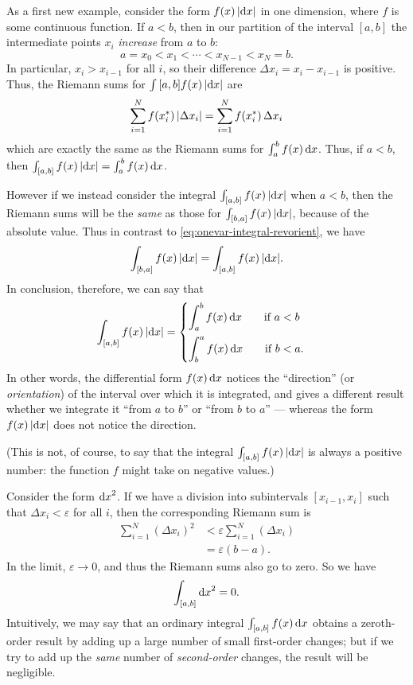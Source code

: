 \documentclass[12pt]{amsart}
\begin{document}
\begin{eg}\label{eg:onevar-absint}
  As a first new example, consider the form $f(x) \, |\dx|$ in one dimension, where $f$ is some continuous function.
  If $a<b$, then in our partition of the interval $[a,b]$ the intermediate points $x_i$ \emph{increase} from $a$ to $b$:
  \[ a = x_0 < x_1 < \cdots < x_{N-1} < x_N = b. \]
  In particular, $x_i > x_{i-1}$ for all $i$, so their difference $\Delta x_i = x_i - x_{i-1}$ is positive.
  Thus, the Riemann sums for $\int{[a,b]} f(x) \, |\dx|$ are
  \[ \sum_{i=1}^N f(\rstag x i)\, |\Delta x_i| = \sum_{i=1}^N f(\rstag x i)\, \Delta x_i\]
  which are exactly the same as the Riemann sums for $\itint x a b {f(x)}$.
  Thus, if $a<b$, then $\lint{[a,b]} f(x) \, |\dx| = \itint x a b {f(x)}$.

  However if we instead consider the integral $\lint{[a,b]} f(x) \, |\dx|$ when $a<b$, then the Riemann sums will be the \emph{same} as those for $\lint{[b,a]} f(x) \, |\dx|$, because of the absolute value.
  Thus in contrast to \cref{eq:onevar-integral-revorient}, we have
  \begin{equation}\label{eq:onevar-absint-revorient}
    \lint{[b,a]} f(x)\,|\dx| = \lint{[a,b]} f(x) \,|\dx|.
  \end{equation}
  In conclusion, therefore, we can say that
  \begin{equation}
    \lint{[a,b]} f(x) \,|\dx| =
    \begin{cases}
      \displaystyle\itint x a b {f(x)} \qquad\text{if } a<b\\[10pt]
      \displaystyle\itint x b a {f(x)} \qquad\text{if } b<a.
    \end{cases}\label{eq:onevar-absint}
  \end{equation}
  In other words, the differential form $f(x)\,\dx$ notices the ``direction'' (or \emph{orientation}) of the interval over which it is integrated, and gives a different result whether we integrate it ``from $a$ to $b$'' or ``from $b$ to $a$'' --- whereas the form $f(x)\,|\dx|$ does not notice the direction.

  (This is not, of course, to say that the integral $\lint{[a,b]} f(x) \,|\dx|$ is always a positive number: the function $f$ might take on negative values.)
\end{eg}

\begin{eg}
  Consider the form $\dx^2$.
  If we have a division into subintervals $[x_{i-1},x_i]$ such that $\Delta x_i < \varepsilon$ for all $i$, then the corresponding Riemann sum is
  \begin{align*}
    \sum_{i=1}^N (\Delta x_i)^2 &< \varepsilon \sum_{i=1}^N (\Delta x_i)\\
    &= \varepsilon (b-a).
  \end{align*}
  In the limit, $\varepsilon \to 0$, and thus the Riemann sums also go to zero.
  So we have
  \[ \lint{[a,b]} \dx^2 = 0. \]
  Intuitively, we may say that an ordinary integral $\lint{[a,b]} f(x) \,\dx$ obtains a zeroth-order result by adding up a large number of small first-order changes; but if we try to add up the \emph{same} number of \emph{second-order} changes, the result will be negligible.
\end{eg}
\end{document}
